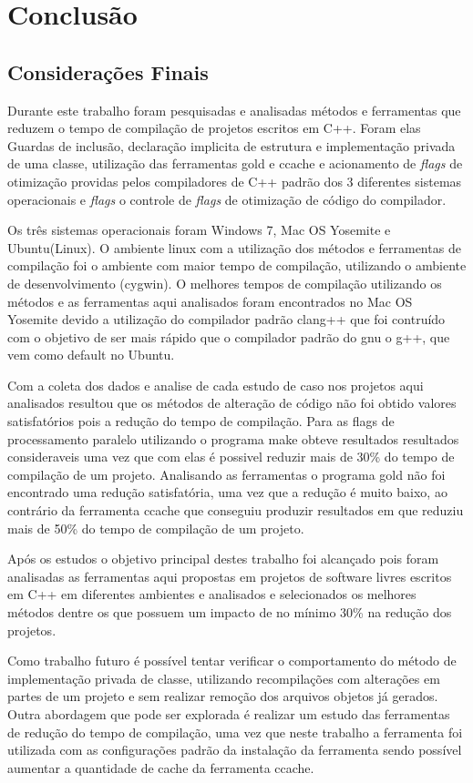 \part{Conclusão}

\chapter[Conclusão]{Considerações Finais}

	Durante este trabalho foram pesquisadas e analisadas métodos e ferramentas que reduzem
 o tempo de compilação de projetos escritos em C++. Foram elas Guardas de inclusão,
 declaração implicita de estrutura e implementação privada de uma classe, utilização das
 ferramentas gold e ccache e acionamento de \textit{flags} de otimização providas pelos
 compiladores de C++ padrão dos 3 diferentes sistemas operacionais e \textit{flags} o controle de
 \textit{flags} de otimização de código do compilador.

	Os três sistemas operacionais foram Windows 7, Mac OS Yosemite e Ubuntu(Linux). O ambiente
 linux com a utilização dos métodos e ferramentas de compilação foi o ambiente com maior
 tempo de compilação, utilizando o ambiente de desenvolvimento (cygwin). O melhores tempos de
 compilação utilizando os métodos e as ferramentas aqui analisados foram encontrados no
 Mac OS Yosemite devido a utilização do compilador padrão clang++ que foi
 contruído com o objetivo de ser mais rápido que o compilador padrão do gnu o g++, que vem
 como default no Ubuntu.

    Com a coleta dos dados e analise de cada estudo de caso nos projetos aqui analisados resultou que
 os métodos de alteração de código não foi obtido valores satisfatórios pois a redução do
 tempo de compilação. Para as flags de processamento paralelo utilizando o programa make
 obteve resultados resultados consideraveis uma vez que com elas é possivel reduzir mais
 de 30\% do tempo de compilação de um projeto. Analisando as ferramentas o programa gold
 não foi encontrado uma redução satisfatória, uma vez que a redução é muito baixo, ao
 contrário da ferramenta ccache que conseguiu produzir resultados em que reduziu mais
 de 50\% do tempo de compilação de um projeto.

	Após os estudos o objetivo principal destes trabalho foi alcançado pois foram
 analisadas as ferramentas aqui propostas em projetos de software livres escritos em C++ 
em diferentes ambientes e analisados e selecionados os melhores métodos dentre os que possuem
um impacto de no mínimo 30\% na redução dos projetos.

	Como trabalho futuro é possível tentar verificar o comportamento do método de implementação
 privada de classe, utilizando recompilações com alterações em partes de um projeto e sem
 realizar remoção dos arquivos objetos já gerados.
	Outra abordagem que pode ser explorada é realizar um estudo das ferramentas de redução do
 tempo de compilação, uma vez que neste trabalho a ferramenta foi utilizada com as configurações
 padrão da instalação da ferramenta sendo possível aumentar a quantidade de cache
 da ferramenta ccache.
